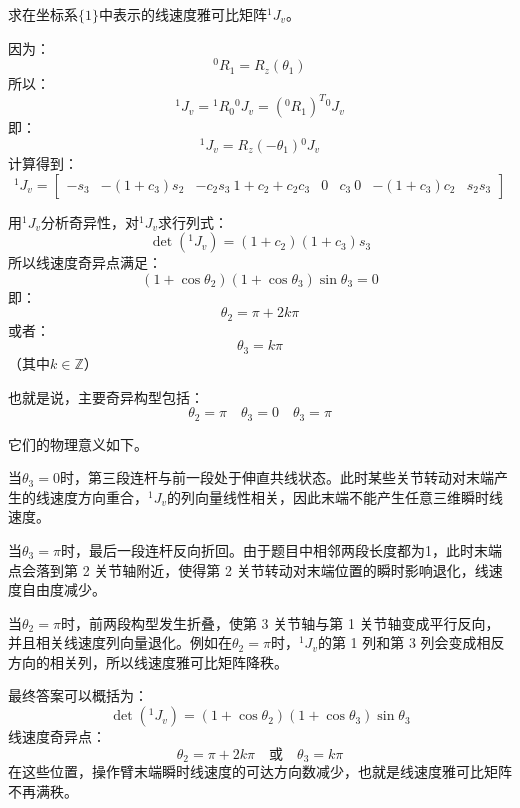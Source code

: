 {求在坐标系$\{1\}$中表示的线速度雅可比矩阵${}^1J_v$。

因为：
$$
{}^0R_1 = R_z(\theta_1)
$$
所以：
$$
{}^1J_v={}^1R_0{}^0J_v=({}^0R_1)^T{}^0J_v
$$
即：
$$
{}^1J_v=
R_z(-\theta_1){}^0J_v
$$
计算得到：
$$
{}^1J_v=
\begin{bmatrix}
-s_3 & -(1+c_3)s_2 & -c_2s_3\
1+c_2+c_2c_3 & 0 & c_3\
0 & -(1+c_3)c_2 & s_2s_3
\end{bmatrix}
$$

用${}^1J_v$分析奇异性，对${}^1J_v$求行列式：
$$
\det({}^1J_v)=(1+c_2)(1+c_3)s_3
$$
所以线速度奇异点满足：
$$
(1+\cos\theta_2)(1+\cos\theta_3)\sin\theta_3=0
$$
即：
$$
\theta_2=\pi+2k\pi
$$
或者：
$$
\theta_3=k\pi
$$
（其中$k\in\mathbb{Z}$）

也就是说，主要奇异构型包括：
$$
\theta_2=\pi \quad \theta_3=0 \quad \theta_3=\pi
$$

它们的物理意义如下。

当$\theta_3=0$时，第三段连杆与前一段处于伸直共线状态。此时某些关节转动对末端产生的线速度方向重合，${}^1J_v$的列向量线性相关，因此末端不能产生任意三维瞬时线速度。

当$\theta_3=\pi$时，最后一段连杆反向折回。由于题目中相邻两段长度都为1，此时末端点会落到第 2 关节轴附近，使得第 2 关节转动对末端位置的瞬时影响退化，线速度自由度减少。

当$\theta_2=\pi$时，前两段构型发生折叠，使第 3 关节轴与第 1 关节轴变成平行反向，并且相关线速度列向量退化。例如在$\theta_2=\pi$时，${}^1J_v$的第 1 列和第 3 列会变成相反方向的相关列，所以线速度雅可比矩阵降秩。

最终答案可以概括为：
$$
\det({}^1J_v) = (1+\cos\theta_2)(1+\cos\theta_3)\sin\theta_3
$$
线速度奇异点：
$$
\theta_2=\pi+2k\pi
\quad\text{或}\quad
\theta_3=k\pi
$$
在这些位置，操作臂末端瞬时线速度的可达方向数减少，也就是线速度雅可比矩阵不再满秩。
}

